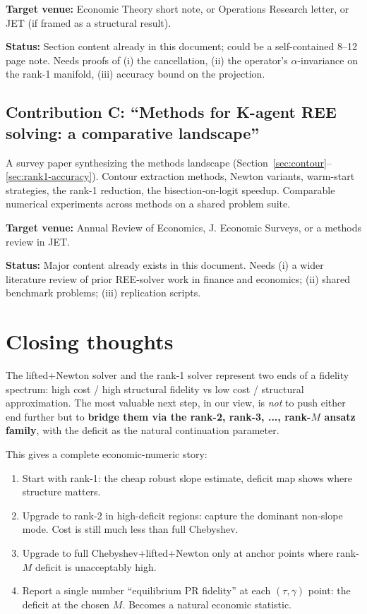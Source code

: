 \documentclass[11pt]{article}
\begin{document}
\textbf{Target venue:} Economic Theory short note, or Operations Research letter, or
JET (if framed as a structural result).

\textbf{Status:} Section content already in this document; could be a self-contained
8--12 page note. Needs proofs of (i) the cancellation, (ii) the operator's
$\alpha$-invariance on the rank-1 manifold, (iii) accuracy bound on the projection.

\subsection{Contribution C: ``Methods for K-agent REE solving: a comparative landscape''}

A survey paper synthesizing the methods landscape (Section~\ref{sec:contour}--\ref{sec:rank1-accuracy}).
Contour extraction methods, Newton variants, warm-start strategies, the rank-1 reduction,
the bisection-on-logit speedup. Comparable numerical experiments across methods on a
shared problem suite.

\textbf{Target venue:} Annual Review of Economics, J. Economic Surveys, or a methods
review in JET.

\textbf{Status:} Major content already exists in this document. Needs (i) a wider
literature review of prior REE-solver work in finance and economics; (ii) shared
benchmark problems; (iii) replication scripts.

\section{Closing thoughts}

The lifted+Newton solver and the rank-1 solver represent two ends of a fidelity
spectrum: high cost / high structural fidelity vs low cost / structural approximation.
The most valuable next step, in our view, is \emph{not} to push either end further but to
\textbf{bridge them via the rank-2, rank-3, ..., rank-$M$ ansatz family}, with the
deficit as the natural continuation parameter.

This gives a complete economic-numeric story:
\begin{enumerate}
\item Start with rank-1: the cheap robust slope estimate, deficit map shows where
structure matters.
\item Upgrade to rank-2 in high-deficit regions: capture the dominant non-slope mode.
Cost is still much less than full Chebyshev.
\item Upgrade to full Chebyshev+lifted+Newton only at anchor points where rank-$M$
deficit is unacceptably high.
\item Report a single number ``equilibrium PR fidelity'' at each $(\tau, \gamma)$ point:
the deficit at the chosen $M$. Becomes a natural economic statistic.
\end{enumerate}
\end{document}
